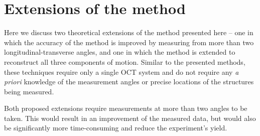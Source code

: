 \documentclass[preprint,NumberedRefs]{JASA}
\begin{document}
\section{Extensions of the method}
\par{Here we discuss two theoretical extensions of the method presented here -- one in which the accuracy of the method is improved by measuring from more than two longitudinal-transverse angles, and one in which the method is extended to reconstruct all three components of motion. Similar to the presented methods, these techniques require only a single OCT system and do not require any \textit{a priori} knowledge of the measurement angles or precise locations of the structures being measured.}
\par{Both proposed extensions require measurements at more than two angles to be taken. This would result in an improvement of the measured data, but would also be significantly more time-consuming and reduce the experiment's yield.}
\end{document}
